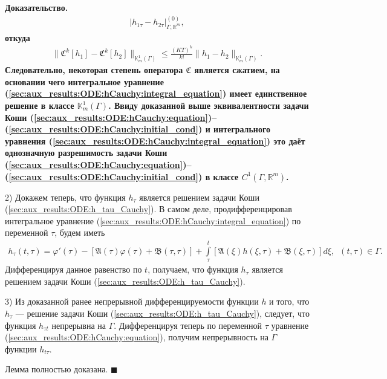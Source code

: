 \documentclass{report}
\newenvironment{Proof}{\par\noindent\bf Доказательство.\rm}{ $\blacksquare$\par}
\begin{document}
\begin{Proof}
\begin{gather*}
\pmb{|}h_{1\tau}-h_{2\tau}\pmb{|}^{(0)}_{\Gamma,\mathbb{R}^m},
\end{gather*}
откуда
\begin{gather*}
\|\mathfrak{C}^k[h_1]-\mathfrak{C}^k[h_2]\|_{\mathbb{K}^1_m(\Gamma)}\leqslant \frac{(KT)^k}{k!}\|h_1-h_2\|_{\mathbb{K}^1_m(\Gamma)}.
\end{gather*}
Следовательно, некоторая степень оператора $\mathfrak{C}$ является сжатием, на основании чего интегральное уравнение (\ref{sec:aux_results:ODE:hCauchy:integral_equation}) имеет единственное
решение в классе $\mathbb{K}^1_m(\Gamma)$. Ввиду доказанной выше эквивалентности задачи Коши (\ref{sec:aux_results:ODE:hCauchy:equation})--(\ref{sec:aux_results:ODE:hCauchy:initial_cond}) и
интегрального уравнения (\ref{sec:aux_results:ODE:hCauchy:integral_equation}) это даёт однозначную разрешимость задачи Коши
(\ref{sec:aux_results:ODE:hCauchy:equation})--(\ref{sec:aux_results:ODE:hCauchy:initial_cond}) в классе $C^1(\Gamma,\mathbb{R}^m)$.

2) Докажем теперь, что функция $h_\tau$ является решением задачи Коши (\ref{sec:aux_results:ODE:h_tau_Cauchy}). В самом деле, продифференцировав интегральное уравнение
(\ref{sec:aux_results:ODE:hCauchy:integral_equation}) по переменной $\tau$, будем иметь
\begin{gather*}
h_\tau(t,\tau)=\varphi'(\tau)-[\mathfrak{A}(\tau)\varphi(\tau)+\mathfrak{B}(\tau,\tau)]+\int\limits_\tau^t[\mathfrak{A}(\xi)h(\xi,\tau)+\mathfrak{B}(\xi,\tau)]d\xi,\,\,\,(t,\tau)\in\Gamma.
\end{gather*}
Дифференцируя данное равенство по $t$, получаем, что функция $h_\tau$ является решением задачи Коши (\ref{sec:aux_results:ODE:h_tau_Cauchy}).

3) Из доказанной ранее непрерывной дифференцируемости функции $h$ и того, что $h_\tau$ --- решение задачи Коши (\ref{sec:aux_results:ODE:h_tau_Cauchy}), следует, что функция  $h_{\tau t}$
непрерывна на $\Gamma$. Дифференцируя теперь по переменной $\tau$ уравнение (\ref{sec:aux_results:ODE:hCauchy:equation}), получим непрерывность на $\Gamma$ функции $h_{t\tau}$.

Лемма полностью доказана.
\end{Proof}
\end{document}
